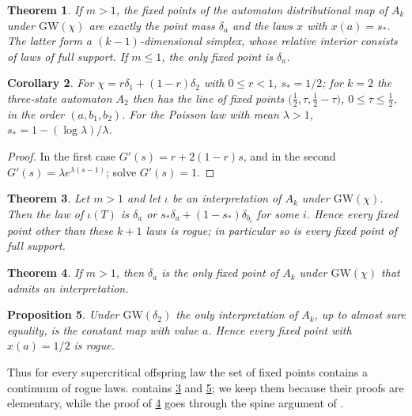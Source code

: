 \documentclass[11pt]{amsart}
\newtheorem{theorem}{Theorem}[section]
\newtheorem{proposition}[theorem]{Proposition}
\newtheorem{corollary}[theorem]{Corollary}
\theoremstyle{remark}
\newcommand{\GW}{\mathrm{GW}}
\begin{document}
\begin{theorem}\label{thm:main}
If $m>1$, the fixed points of the automaton distributional map of $A_k$ under $\GW(\chi)$ are exactly the point mass $\delta_a$ and the laws $x$ with $x(a)=s_*$. The latter form a $(k-1)$-dimensional simplex, whose relative interior consists of laws of full support. If $m\le1$, the only fixed point is $\delta_a$.
\end{theorem}

\begin{corollary}\label{cor:examples}
For $\chi=r\delta_1+(1-r)\delta_2$ with $0\le r<1$, $s_*=1/2$; for $k=2$ the three-state automaton $A_2$ then has the line of fixed points $\bigl(\tfrac12,\tau,\tfrac12-\tau\bigr)$, $0\le \tau\le\tfrac12$, in the order $(a,b_1,b_2)$. For the Poisson law with mean $\lambda>1$, $s_*=1-(\log\lambda)/\lambda$.
\end{corollary}

\begin{proof}
In the first case $G'(s)=r+2(1-r)s$, and in the second $G'(s)=\lambda e^{\lambda(s-1)}$; solve $G'(s)=1$.
\end{proof}

\begin{theorem}\label{thm:interp}
Let $m>1$ and let $\iota$ be an interpretation of $A_k$ under $\GW(\chi)$. Then the law of $\iota(T)$ is $\delta_a$ or $s_*\delta_a+(1-s_*)\delta_{b_i}$ for some $i$. Hence every fixed point other than these $k+1$ laws is rogue; in particular so is every fixed point of full support.
\end{theorem}

\begin{theorem}\label{thm:only}
If $m>1$, then $\delta_a$ is the only fixed point of $A_k$ under $\GW(\chi)$ that admits an interpretation.
\end{theorem}

\begin{proposition}\label{prop:rogue}
Under $\GW(\delta_2)$ the only interpretation of $A_k$, up to almost sure equality, is the constant map with value $a$. Hence every fixed point with $x(a)=1/2$ is rogue.
\end{proposition}

Thus for every supercritical offspring law the set of fixed points contains a continuum of rogue laws.  contains \cref{thm:interp} and \cref{prop:rogue}; we keep them because their proofs are elementary, while the proof of \cref{thm:only} goes through the spine argument of \cite[Section~4]{JPS}.
\end{document}
